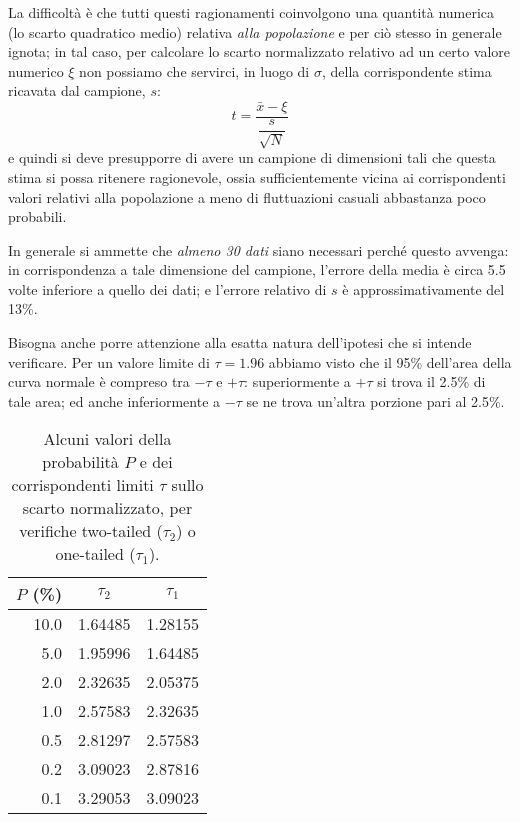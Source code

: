 La difficolt\`a \`e che tutti questi ragionamenti
coinvolgono una quantit\`a numerica (lo scarto quadratico
medio) relativa \emph{alla popolazione} e per ci\`o stesso
in generale ignota; in tal caso, per calcolare lo scarto
normalizzato relativo ad un certo valore numerico $\xi$ non
possiamo che servirci, in luogo di $\sigma$, della
corrispondente stima ricavata dal campione, $s$:
\begin{equation*}
  t = \frac{\bar x - \xi}{\dfrac{s}{\sqrt{N}}}
\end{equation*}
e quindi si deve presupporre di avere un campione di
dimensioni tali che questa stima si possa ritenere
ragionevole, ossia sufficientemente vicina ai corrispondenti
valori relativi alla popolazione a meno di fluttuazioni
casuali abbastanza poco probabili.

In generale si ammette che \emph{almeno 30 dati} siano
necessari perch\'e questo avvenga: in corrispondenza a tale
dimensione del campione, l'errore della media \`e circa 5.5
volte inferiore a quello dei dati; e l'errore relativo di
$s$ \`e approssimativamente del 13\%.

Bisogna anche porre attenzione alla esatta natura
dell'ipotesi che si intende verificare.  Per un valore
limite di $\tau = 1.96$ abbiamo visto che il 95\% dell'area
della curva normale \`e compreso tra $-\tau$ e $+\tau$:
superiormente a $+\tau$ si trova il 2.5\% di tale area; ed
anche inferiormente a $-\tau$ se ne trova un'altra porzione
pari al 2.5\%.

\begin{table}[htbp]
  \vspace*{2ex}
  \begin{center}
    \begin{tabular}{rcc}
      \toprule
      \multicolumn{1}{c}{$P$ (\%)} & $\tau_2$ & $\tau_1$ \\
      \midrule
      10.0 & 1.64485 & 1.28155 \\
      5.0  & 1.95996 & 1.64485 \\
      2.0  & 2.32635 & 2.05375 \\
      1.0  & 2.57583 & 2.32635 \\
      0.5  & 2.81297 & 2.57583 \\
      0.2  & 3.09023 & 2.87816 \\
      0.1  & 3.29053 & 3.09023 \\
      \bottomrule
    \end{tabular}
  \end{center}
  \caption{Alcuni valori della
    probabilit\`a $P$ e dei corrispondenti limiti
    $\tau$ sullo scarto normalizzato, per verifiche
    two-tailed ($\tau_2$) o one-tailed ($\tau_1$).}
  \label{tab:12.conlev1}
\end{table}

